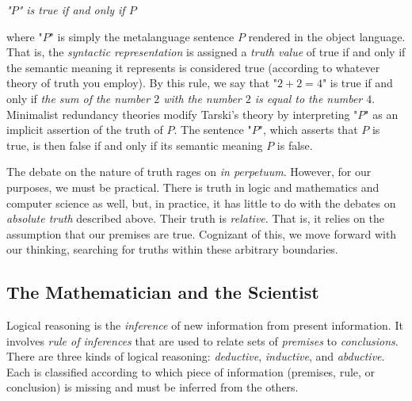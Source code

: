 \begin{tcolorbox}[breakable, enhanced, colback=textbook-blue, sharp corners]
	\begin{center}
		\textit{"$P$" is true if and only if $P$}
	\end{center}
	
	where "$P$" is simply the metalanguage sentence $P$ rendered in the object language. That is, the \textit{syntactic representation} is assigned a \textit{truth value} of true if and only if the semantic meaning it represents is considered true (according to whatever theory of truth you employ). By this rule, we say that "$2+2=4$" is true if and only if \textit{the sum of the number $2$ with the number $2$ is equal to the number $4$}. Minimalist redundancy theories modify Tarski's theory by interpreting "$P$" as an implicit assertion of the truth of $P$. The sentence "$P$", which asserts that $P$ is true, is then false if and only if its semantic meaning $P$ is false. \\
	
	\parbreak
	\vspace{4mm}
	
	The debate on the nature of truth rages on \textit{in perpetuum}. However, for our purposes, we must be practical. There is truth in logic and mathematics and computer science as well, but, in practice, it has little to do with the debates on \textit{absolute truth} described above. Their truth is \textit{relative}. That is, it relies on the assumption that our premises are true. Cognizant of this, we move forward with our thinking, searching for truths within these arbitrary boundaries. \\
	\vspace{1mm}
\end{tcolorbox}
\vspace{7mm}


\subsection{The Mathematician and the Scientist}


Logical reasoning is the \textit{inference} of new information from present information. It involves \textit{rule of inferences} that are used to relate sets of \textit{premises} to \textit{conclusions}. There are three kinds of logical reasoning: \textit{deductive}, \textit{inductive}, and \textit{abductive}. Each is classified according to which piece of information (premises, rule, or conclusion) is missing and must be inferred from the others. \\


